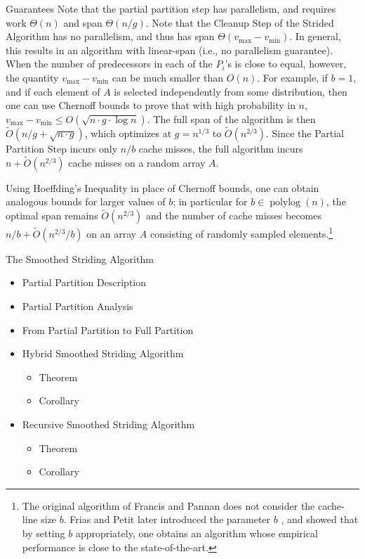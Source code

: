 \documentclass{beamer}
\begin{document}
\begin{frame}[t]{Guarantees}
	Note that the partial partition step has parallelism, and requires work $\Theta(n)$ and span $\Theta(n/g)$.
Note that the Cleanup Step of the Strided Algorithm has no
parallelism, and thus has span $\Theta(v_{\text{max}} -
v_{\text{min}})$.  In general, this results in an algorithm with
linear-span (i.e., no parallelism guarantee).  When the number of
predecessors in each of the $P_i$'s is close to equal, however, the
quantity $v_{\text{max}} - v_{\text{min}}$ can be much smaller than
$O(n)$.  For example, if $b = 1$, and if each element of $A$ is
selected independently from some distribution, then one can use
Chernoff bounds to prove that with high probability in $n$,
$v_{\text{max}} - v_{\text{min}} \le O(\sqrt{n \cdot g \cdot \log
  n})$.  The full span of the algorithm is then $\tilde{O}(n/g +
\sqrt{n \cdot g})$, which optimizes at $g = n^{1/3}$ to
$\tilde{O}(n^{2/3})$. Since the Partial Partition Step incurs only $n
/ b$ cache misses, the full algorithm incurs $n + \tilde{O}(n^{2/3})$ cache
misses on a random array $A$.


Using Hoeffding's Inequality in place of Chernoff bounds, one can
obtain analogous bounds for larger values of $b$; in particular for $b
\in \operatorname{polylog}(n)$, the optimal span remains
$\tilde{O}(n^{2/3})$ and the number of cache misses becomes $n / b +
\tilde{O}(n^{2/3} / b)$ on an array $A$ consisting of randomly sampled
elements.\footnote{The original algorithm of Francis and Pannan
  \cite{FrancisPa92} does not consider the cache-line size $b$. Frias
  and Petit later introduced the parameter $b$ \cite{Frias08}, and
  showed that by setting $b$ appropriately, one obtains an algorithm
  whose empirical performance is close to the state-of-the-art.}
\end{frame}

\begin{frame}[t]{The Smoothed Striding Algorithm}
	\begin{itemize}
		\item Partial Partition Description
		\item Partial Partition Analysis 
		\item From Partial Partition to Full Partition
		\item Hybrid Smoothed Striding Algorithm
		\begin{itemize}
			\item Theorem
			\item Corollary
		\end{itemize}
		\item Recursive Smoothed Striding Algorithm
		\begin{itemize}
			\item Theorem
			\item Corollary
		\end{itemize}
	\end{itemize}
\end{frame}
\end{document}
